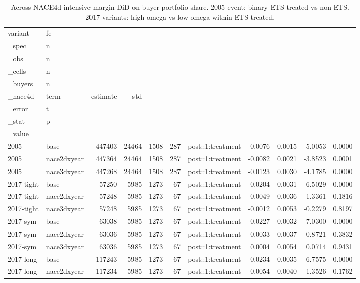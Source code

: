 \begin{table}[ht]
\centering
\caption{Across-NACE4d intensive-margin DiD on buyer portfolio share. 2005 event: binary ETS-treated vs non-ETS. 2017 variants: high-omega vs low-omega within ETS-treated.} 
\begin{tabular}{llrrrrlrrrr}
  \toprule
variant & fe\\_spec & n\\_obs & n\\_cells & n\\_buyers & n\\_nace4d & term & estimate & std\\_error & t\\_stat & p\\_value \\ 
  \midrule
2005 & base & 447403 & 24464 &  1508 &   287 & post::1:treatment & -0.0076 & 0.0015 & -5.0053 & 0.0000 \\ 
  2005 & nace2dxyear & 447364 & 24464 &  1508 &   287 & post::1:treatment & -0.0082 & 0.0021 & -3.8523 & 0.0001 \\ 
  2005 & nace3dxyear & 447268 & 24464 &  1508 &   287 & post::1:treatment & -0.0123 & 0.0030 & -4.1785 & 0.0000 \\ 
  2017-tight & base & 57250 &  5985 &  1273 &    67 & post::1:treatment & 0.0204 & 0.0031 & 6.5029 & 0.0000 \\ 
  2017-tight & nace2dxyear & 57248 &  5985 &  1273 &    67 & post::1:treatment & -0.0049 & 0.0036 & -1.3361 & 0.1816 \\ 
  2017-tight & nace3dxyear & 57248 &  5985 &  1273 &    67 & post::1:treatment & -0.0012 & 0.0053 & -0.2279 & 0.8197 \\ 
  2017-sym & base & 63038 &  5985 &  1273 &    67 & post::1:treatment & 0.0227 & 0.0032 & 7.0300 & 0.0000 \\ 
  2017-sym & nace2dxyear & 63036 &  5985 &  1273 &    67 & post::1:treatment & -0.0033 & 0.0037 & -0.8721 & 0.3832 \\ 
  2017-sym & nace3dxyear & 63036 &  5985 &  1273 &    67 & post::1:treatment & 0.0004 & 0.0054 & 0.0714 & 0.9431 \\ 
  2017-long & base & 117243 &  5985 &  1273 &    67 & post::1:treatment & 0.0234 & 0.0035 & 6.7575 & 0.0000 \\ 
  2017-long & nace2dxyear & 117234 &  5985 &  1273 &    67 & post::1:treatment & -0.0054 & 0.0040 & -1.3526 & 0.1762 \\ 

\end{tabular}
\end{table}
